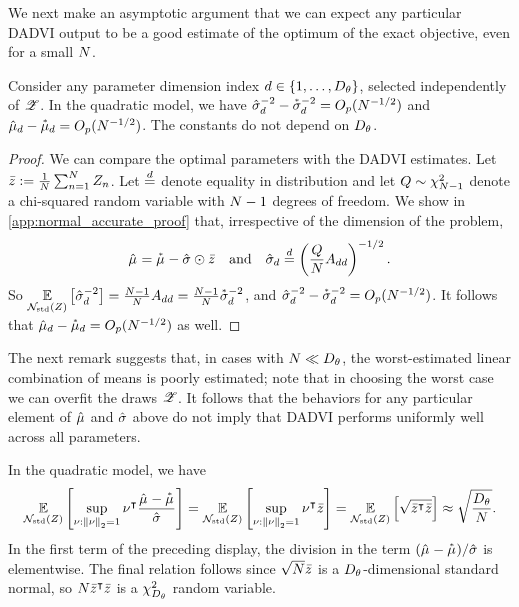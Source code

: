 We next make an asymptotic argument that we can expect any particular DADVI output
to be a good estimate of the optimum of the exact objective, even for a small $\znum$.
%
\begin{proposition}\label{prop:normal_accurate}
Consider any parameter dimension index $d \in \{1, \ldots, \thetadim\}$,
selected independently of $\Z$. In the quadratic model, we have
$\etasigmahat[d]^{-2} - \etasigmastar[d]^{-2}= O_p(\znum^{-1/2})$ and
$\etamuhat[d] - \etamustar[d] = O_p(\znum^{-1/2})$. The constants do not depend
on $\thetadim$.
%
\end{proposition}

\begin{proof}
We can compare the optimal parameters with the DADVI estimates.  Let $\zbar :=
\meann \z_n$.  Let $\dequal$ denote equality in distribution and let $Q \sim
\chi^2_{\znum-1}$ denote a chi-squared random variable with $\znum-1$ degrees of
freedom. We show in \cref{app:normal_accurate_proof} that, irrespective of the
dimension of the problem,
%
\begin{align*}
%
\etamuhat = \etamustar - \etasigmahat \odot \zbar
\quad\textrm{and}\quad
\etasigmahat[d] \dequal \left(\frac{Q}{\znum} A_{dd} \right)^{-1/2}.
%
\end{align*}
%
So $\expect{\normz}{\etasigmahat[d]^{-2}} = \frac{\znum - 1}{\znum} A_{dd} =
\frac{\znum - 1}{\znum} \etasigmastar[d]^{-2}$, and $\etasigmahat[d]^{-2} -
\etasigmastar[d]^{-2}= O_p(\znum^{-1/2})$.  It follows that $\etamuhat[d] -
\etamustar[d] = O_p(\znum^{-1/2})$ as well.
\end{proof}

The next remark suggests that, in cases with $N \ll \thetadim$, the
worst-estimated linear combination of means is poorly estimated; note that in
choosing the worst case we can overfit the draws $\Z$. It follows that the
behaviors for any particular element of $\etamuhat$ and $\etasigmahat$ above do
not imply that DADVI performs uniformly well across all parameters. 
%
\begin{remark} \label{rem:worst_case}
%
In the quadratic model, we have
%
\begin{align*}
%
\expect{\normz}{
    \sup_{\nu: \norm{\nu}_2 = 1}
    \nu^\trans \frac{\etamuhat - \etamustar}{\etasigmahat}} =
\expect{\normz}{
    \sup_{\nu: \norm{\nu}_2 = 1} \nu^\trans \zbar} =
    \expect{\normz}{\sqrt{\zbar^\trans \zbar}} \approx
    \sqrt{\frac{\thetadim}{N}}.
%
\end{align*}
%
In the first term of the preceding display, the division in the term $(\etamuhat
- \etamustar) / \etasigmahat$ is elementwise. The final relation follows since
$\sqrt{N} \zbar$ is a $\thetadim$-dimensional standard normal, so $N
\zbar^\trans \zbar$ is a $\chi^2_{\thetadim}$ random variable.
%
\end{remark}
%

